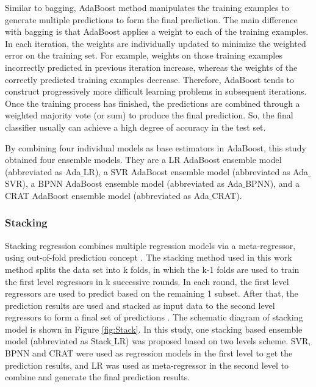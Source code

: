 \documentclass[11pt]{article}
\begin{document}
	
	Similar to bagging, AdaBoost method \cite{freund1996experiments} manipulates the training examples to generate multiple predictions to form the final prediction. The main difference with bagging is that AdaBoost applies a weight to each of the training examples. In each iteration, the weights are individually updated to minimize the weighted error on the training set. For example, weights on those training examples incorrectly predicted in previous iteration increase, whereas the weights of the correctly predicted training examples decrease. Therefore, AdaBoost tends to construct progressively more difficult learning problems in subsequent iterations. Once the training process has finished, the predictions are combined through a weighted majority vote (or sum) to produce the final prediction. So, the final classifier usually can achieve a high degree of accuracy in the test set.
	
By combining four individual models as base estimators in AdaBoost, this study obtained four ensemble models. They are a LR AdaBoost ensemble model (abbreviated as Ada$\_$LR), a SVR AdaBoost ensemble model (abbreviated as Ada$\_$SVR), a BPNN AdaBoost ensemble model (abbreviated as Ada$\_$BPNN), and a CRAT AdaBoost ensemble model (abbreviated as Ada$\_$CRAT). 

	
	\subsubsection{Stacking}

	
	Stacking regression combines multiple regression models via a meta-regressor, using out-of-fold prediction concept \cite{raschkas_2018_mlxtend}. The stacking method used in this work method splits the data set into k folds, in which the k-1 folds are used to train the first level regressors in k successive rounds. In each round, the first level regressors are used to predict based on the remaining 1 subset. After that, the prediction results are used and stacked as input data to the second level regressors to form a final set of predictions \cite{sill2009feature}. The schematic diagram of stacking model is shown in Figure \ref{fig:Stack}.  In this study, one stacking based ensemble model (abbreviated as Stack$\_$LR) was proposed based on two levels scheme. SVR, BPNN and CRAT were used as regression models in the first level to get the prediction results, and LR was used as meta-regressor in the second level to combine and generate the final prediction results.
	
\end{document}
